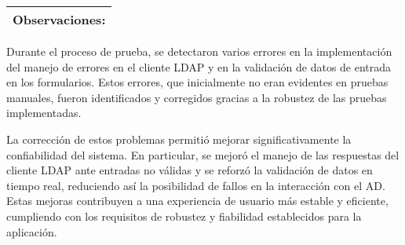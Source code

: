 \begin{longtable}{|p{2cm}|p{2.5cm}|p{2.5cm}|p{2.5cm}|p{2.5cm}|p{2.7cm}|}
    \multicolumn{6}{|l|}{\textbf{Observaciones}: }                                                                                                                                                                                                                                                                                                                                                                                                                                               \\ \hline
\end{longtable}


Durante el proceso de prueba, se detectaron varios errores en la implementación del manejo de errores en el cliente LDAP y en la validación de datos de entrada en los formularios. Estos errores, que inicialmente no eran evidentes en pruebas manuales, fueron identificados y corregidos gracias a la robustez de las pruebas implementadas.

La corrección de estos problemas permitió mejorar significativamente la confiabilidad del sistema. En particular, se mejoró el manejo de las respuestas del cliente LDAP ante entradas no válidas y se reforzó la validación de datos en tiempo real, reduciendo así la posibilidad de fallos en la interacción con el AD. Estas mejoras contribuyen a una experiencia de usuario más estable y eficiente, cumpliendo con los requisitos de robustez y fiabilidad establecidos para la aplicación.
